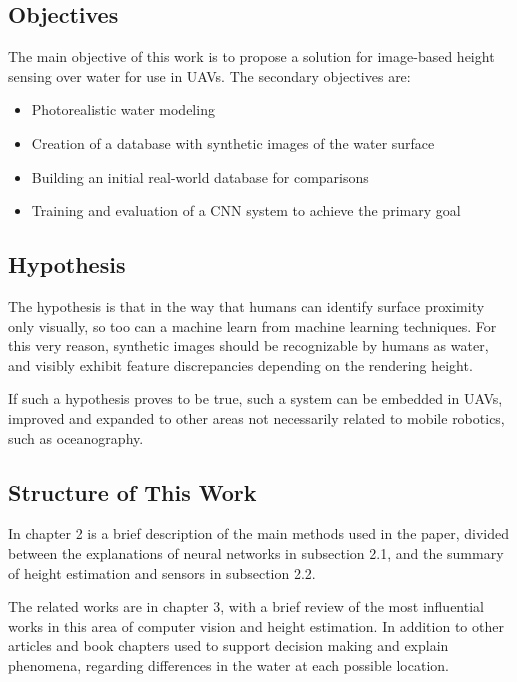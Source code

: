     \subsection{Objectives}
    
    The main objective of this work is to propose a solution for image-based height sensing over water for use in UAVs. The secondary objectives are:
    
    \begin{itemize}
	    \item Photorealistic water modeling 
	    \item Creation of a database with synthetic images of the water surface
	    \item Building an initial real-world database for comparisons
	    \item Training and evaluation of a CNN system to achieve the primary goal
	\end{itemize}


    \subsection{Hypothesis}
    The hypothesis is that in the way that humans can identify surface proximity only visually, so too can a machine learn from machine learning techniques. For this very reason, synthetic images should be recognizable by humans as water, and visibly exhibit feature discrepancies depending on the rendering height.

    If such a hypothesis proves to be true, such a system can be embedded in UAVs, improved and expanded to other areas not necessarily related to mobile robotics, such as oceanography.

    \subsection{Structure of This Work}
    
    In chapter 2 is a brief description of the main methods used in the paper, divided between the explanations of neural networks in subsection 2.1, and the summary of height estimation and sensors in subsection 2.2.
    
    The related works are in chapter 3, with a brief review of the most influential works in this area of computer vision and height estimation. In addition to other articles and book chapters used to support decision making and explain phenomena, regarding differences in the water at each possible location.
    
